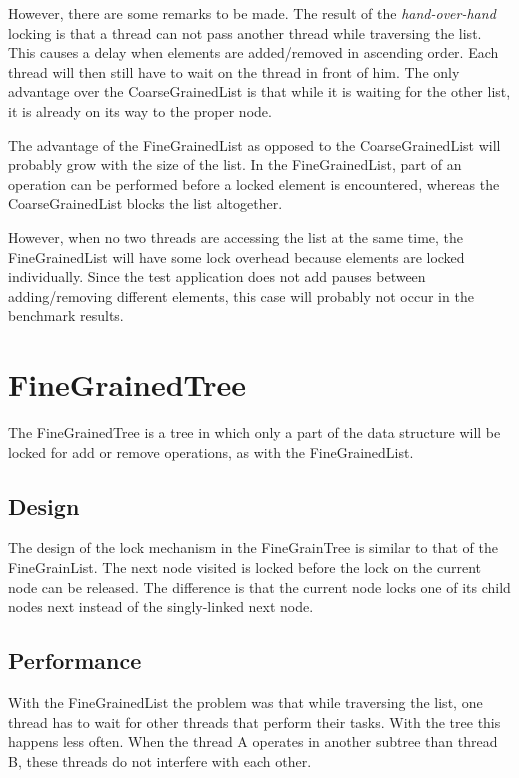 \documentclass[a4paper]{article}
\begin{document}
However, there are some remarks to be made. The result of the 
\emph{hand-over-hand} locking is that a thread can not pass another thread
while traversing the list. This causes a delay when elements are added/removed
in ascending order. Each thread will then still have to wait on the thread in
front of him. The only advantage over the CoarseGrainedList is that while
it is waiting for the other list, it is already on its way to the proper node.

The advantage of the FineGrainedList as opposed to the CoarseGrainedList will
probably grow with the size of the list. In the FineGrainedList, part of an
operation can be performed before a locked element is encountered, whereas the
CoarseGrainedList blocks the list altogether.

However, when no two threads are accessing the list at the same time, the
FineGrainedList will have some lock overhead because elements are locked
individually. Since the test application does not add pauses between
adding/removing different elements, this case will probably not occur in the
benchmark results.

\section{FineGrainedTree}

The FineGrainedTree is a tree in which only a part of the data structure
will be locked for add or remove operations, as with the FineGrainedList.

\subsection{Design}

The design of the lock mechanism in the FineGrainTree is similar to that of the
FineGrainList. The next node visited is locked before the lock on the current
node can be released. The difference is that the current node locks one of its
child nodes next instead of the singly-linked next node.

\subsection{Performance}

With the FineGrainedList the problem was that while traversing the list, one
thread has to wait for other threads that perform their tasks. With the tree
this happens less often. When the thread A operates in another subtree than
thread B, these threads do not interfere with each other.
\end{document}
